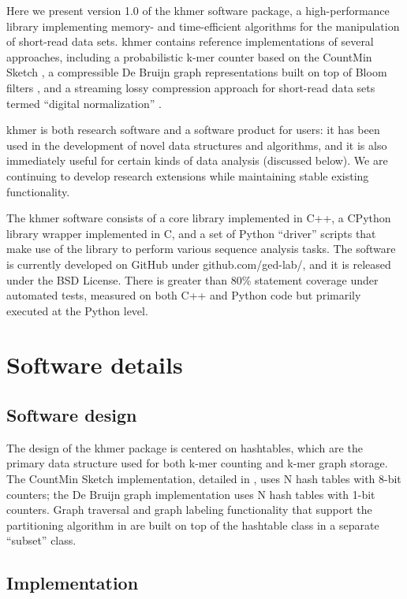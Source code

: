 \documentclass[10pt]{article}
\begin{document}
Here we present version 1.0 of the khmer software package, a
high-performance library implementing memory- and time-efficient
algorithms for the manipulation of short-read data sets.  khmer
contains reference implementations of several approaches, including a
probabilistic k-mer counter based on the CountMin Sketch \cite{Zhang2013}, a
compressible De Bruijn graph representations built on top of Bloom
filters \cite{Pell2012}, and a streaming lossy compression approach for
short-read data sets termed ``digital normalization'' \cite{Brown2012}.

khmer is both research software and a software product for users: it
has been used in the development of novel data structures and
algorithms, and it is also immediately useful for certain kinds of
data analysis (discussed below).  We are continuing to develop research
extensions while maintaining stable existing functionality.

The khmer software consists of a core library implemented in C++, a
CPython library wrapper implemented in C, and a set of Python
``driver'' scripts that make use of the library to perform various
sequence analysis tasks.  The software is currently developed on
GitHub under github.com/ged-lab/, and it is released under the BSD
License.  There is greater than 80\% statement coverage under
automated tests, measured on both C++ and Python code but primarily
executed at the Python level.

\section*{Software details}

\subsection*{Software design}

The design of the khmer package is centered on hashtables, which are
the primary data structure used for both k-mer counting and k-mer
graph storage.  The CountMin Sketch implementation, detailed in \cite{Zhang2013},
uses N hash tables with 8-bit counters; the De Bruijn graph implementation
uses N hash tables with 1-bit counters.  Graph traversal and
graph labeling functionality that support the partitioning algorithm
in \cite{Pell2012} are built on top of the hashtable class in a separate ``subset''
class.

\subsection*{Implementation}
\end{document}
